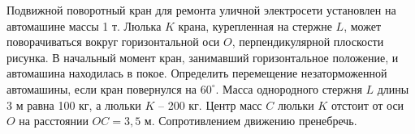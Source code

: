 Подвижной поворотный кран для ремонта
 уличной электросети установлен на
  автомашине массы 1 т.
Люлька $K$ крана, курепленная на стержне $L$,
 может поворачиваться вокруг
  горизонтальной оси $O$,
перпендикулярной плоскости рисунка. В
 начальный момент кран,
занимавший горизонтальное положение, и
 автомашина находилась
в покое. Определить перемещение
 незаторможенной автомашины, 
если кран повернулся на $60^\circ$. Масса
 однородного стержня $L$ длины
3 м равна 100 кг, а люльки $K$ -- 200 кг.
Центр масс $C$ люльки $K$ отстоит от оси $O$ на
 расстоянии
$OC = 3{,}5$ м. Сопротивлением движению пренебречь.
